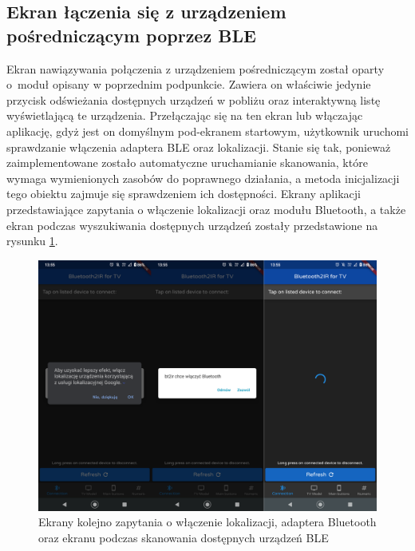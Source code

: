 \documentclass[12pt,twoside]{article}
\begin{document}



\subsection{Ekran łączenia się z urządzeniem pośredniczącym poprzez BLE}
Ekran nawiązywania połączenia z urządzeniem pośredniczącym został oparty o~moduł  opisany w poprzednim podpunkcie. Zawiera on właściwie jedynie przycisk odświeżania dostępnych urządzeń w pobliżu oraz interaktywną listę wyświetlającą te urządzenia.
Przełączając się na ten ekran lub włączając aplikację, gdyż jest on domyślnym pod-ekranem startowym, użytkownik uruchomi sprawdzanie włączenia adaptera BLE oraz lokalizacji. Stanie się tak, ponieważ zaimplementowane zostało automatyczne uruchamianie skanowania, które wymaga wymienionych zasobów do poprawnego działania, a metoda inicjalizacji tego obiektu zajmuje się sprawdzeniem ich dostępności. Ekrany aplikacji przedstawiające zapytania o włączenie lokalizacji oraz modułu Bluetooth, a także ekran podczas wyszukiwania dostępnych urządzeń zostały przedstawione na rysunku \ref*{Fig:initBLE}.
\begin{figure}[ht]
   \centering
   \includegraphics[width=14cm]{images/initBLE.png}
   \caption{Ekrany kolejno zapytania o włączenie lokalizacji, adaptera Bluetooth oraz ekranu podczas skanowania dostępnych urządzeń BLE}
   \label{Fig:initBLE}
\end{figure}
\end{document}
